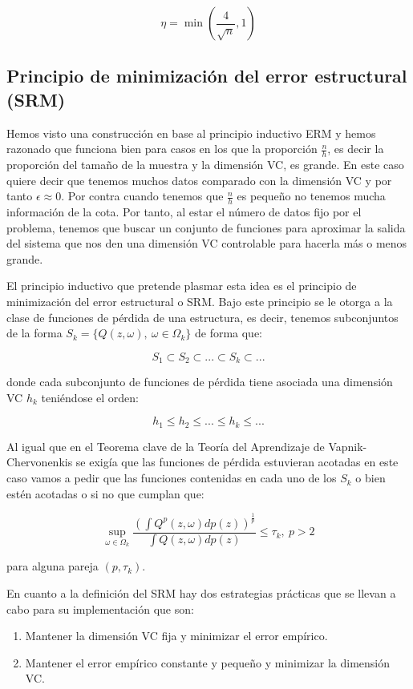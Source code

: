 $$\eta = \min (\frac{4}{\sqrt{n}},1)$$

\subsection{Principio de minimización del error estructural (SRM)}

Hemos visto una construcción en base al principio inductivo ERM y hemos razonado que funciona bien para casos en los que la proporción $\frac{n}{h}$, es decir la proporción del tamaño de la muestra y la dimensión VC, es grande. En este caso quiere decir que tenemos muchos datos comparado con la dimensión VC y por tanto $\epsilon \approx 0$. Por contra cuando tenemos que $\frac{n}{h}$ es pequeño no tenemos mucha información de la cota. Por tanto, al estar el número de datos fijo por el problema, tenemos que buscar un conjunto de funciones para aproximar la salida del sistema que nos den una dimensión VC controlable para hacerla más o menos grande.

El principio inductivo que pretende plasmar esta idea es el principio de minimización del error estructural o SRM. Bajo este principio se le otorga a la clase de funciones de pérdida de una estructura, es decir, tenemos subconjuntos de la forma $S_k = \{ Q(z,\omega), \ \omega \in \Omega_k \}$ de forma que:

$$S_1 \subset S_2 \subset ... \subset S_k \subset ...$$

donde cada subconjunto de funciones de pérdida tiene asociada una dimensión VC $h_k$ teniéndose el orden:

$$h_1 \leq h_2 \leq ... \leq h_k \leq ...$$

Al igual que en el Teorema clave de la Teoría del Aprendizaje de Vapnik-Chervonenkis se exigía que las funciones de pérdida estuvieran acotadas en este caso vamos a pedir que las funciones contenidas en cada uno de los $S_k$ o bien estén acotadas o si no que cumplan que:

$$\sup_{\omega \in \Omega_k} \frac{(\int Q^p (z,\omega)dp(z))^{\frac{1}{p}}}{\int Q(z,\omega)dp(z)}\leq \tau_k , \ p>2$$

para alguna pareja $(p,\tau_k)$.

En cuanto a la definición del SRM hay dos estrategias prácticas que se llevan a cabo para su implementación que son:

\begin{enumerate}
	\item Mantener la dimensión VC fija y minimizar el error empírico.
	\item Mantener el error empírico constante y pequeño y minimizar la dimensión VC.
\end{enumerate}

